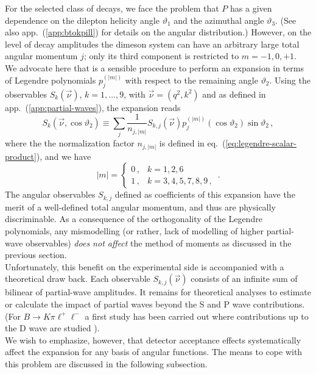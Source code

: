\documentclass[aps,prd,reprint,nofootinbib,preprintnumbers]{revtex4}
\newcommand{\refapp}[1]{app.~(\ref{app:#1})}
\newcommand{\refeq}[1]{eq.~(\ref{eq:#1})}
\renewcommand{\theta}{\vartheta}
\begin{document}
For the selected class of decays, we face the problem that $P$ has a given dependence on the dilepton
helicity angle $\theta_1$ and the azimuthal angle $\theta_3$. (See also \refapp{btokpill} for details
on the angular distribution.) However, on the level of decay amplitudes the dimeson system can have an arbitrary
large total angular momentum $j$; only its third component is restricted to $m = -1,0,+1$.\\

We advocate here that is a sensible procedure to perform an expansion in terms of Legendre polynomials $p_{j}^{(|m|)}$
with respect to the remaining angle $\theta_2$. Using the observables $S_k(\vec{\nu})$, $k=1,\dots,9$, with $\vec{\nu}=(q^2, k^2)$
and as defined in \refapp{partial-waves}, the expansion reads
\begin{equation}
    S_{k}(\vec{\nu},\cos\theta_2) \equiv \sum_{j} \frac{1}{n_{j,|m|}} S_{k,j}(\vec{\nu}) p_{j}^{(|m|)}(\cos\theta_2)\sin\theta_2\,,
\end{equation}
where the the normalization factor $n_{j,|m|}$ is defined in \refeq{legendre-scalar-product}, and we have
\begin{equation}
    |m| = \begin{cases}
        0\,, & k = 1,2,6\,\\
        1\,, & k = 3,4,5,7,8,9\,,
    \end{cases}\,.
\end{equation}
The angular observables $S_{k,j}$ defined as coefficients of this expansion
have the merit of a well-defined total angular momentum, and thus are physically discriminable.
As a consequence of the orthogonality of the Legendre polynomials, any mismodelling (or rather, lack of modelling of higher
partial-wave observables) \emph{does not affect} the method of moments as discussed in the previous section.\\

Unfortunately, this benefit on the experimental side is accompanied with a theoretical draw back. Each observable
$S_{k,j}(\vec{\nu})$ consists of an infinite sum of bilinear of partial-wave amplitudes. It remains for theoretical
analyses to estimate or calculate the impact of partial waves beyond the S and P wave contributions.
(For $B\to K\pi\ell^+\ell^-$ a first study has been carried out where contributions up to the D wave are studied \cite{Das:2014sra}).\\

We wish to emphasize, however, that detector acceptance effects systematically affect the expansion for any basis
of angular functions. The means to cope with this problem are discussed in the following subsection.
\end{document}
